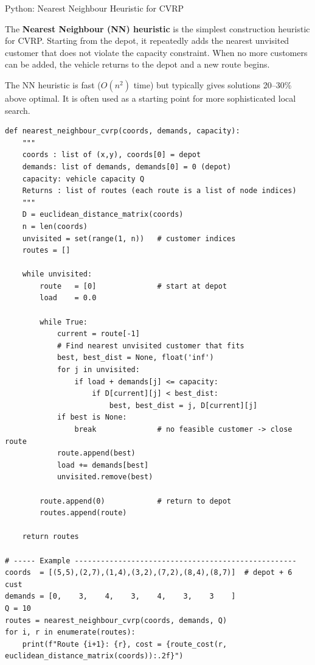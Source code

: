 \documentclass[aspectratio=169,10pt]{beamer}
\begin{document}
\begin{frame}[fragile]{Python: Nearest Neighbour Heuristic for CVRP}

The \textbf{Nearest Neighbour (NN) heuristic} is the simplest construction heuristic
for CVRP.  Starting from the depot, it repeatedly adds the nearest unvisited customer
that does not violate the capacity constraint.  When no more customers can be added,
the vehicle returns to the depot and a new route begins.

The NN heuristic is fast ($O(n^2)$ time) but typically gives solutions 20--30\% above
optimal.  It is often used as a starting point for more sophisticated local search.

\begin{lstlisting}[caption={Nearest Neighbour heuristic for CVRP}]
def nearest_neighbour_cvrp(coords, demands, capacity):
    """
    coords : list of (x,y), coords[0] = depot
    demands: list of demands, demands[0] = 0 (depot)
    capacity: vehicle capacity Q
    Returns : list of routes (each route is a list of node indices)
    """
    D = euclidean_distance_matrix(coords)
    n = len(coords)
    unvisited = set(range(1, n))   # customer indices
    routes = []

    while unvisited:
        route   = [0]              # start at depot
        load    = 0.0

        while True:
            current = route[-1]
            # Find nearest unvisited customer that fits
            best, best_dist = None, float('inf')
            for j in unvisited:
                if load + demands[j] <= capacity:
                    if D[current][j] < best_dist:
                        best, best_dist = j, D[current][j]
            if best is None:
                break              # no feasible customer -> close route
            route.append(best)
            load += demands[best]
            unvisited.remove(best)

        route.append(0)            # return to depot
        routes.append(route)

    return routes

# ----- Example ---------------------------------------------------
coords  = [(5,5),(2,7),(1,4),(3,2),(7,2),(8,4),(8,7)]  # depot + 6 cust
demands = [0,    3,    4,    3,    4,    3,    3    ]
Q = 10
routes = nearest_neighbour_cvrp(coords, demands, Q)
for i, r in enumerate(routes):
    print(f"Route {i+1}: {r}, cost = {route_cost(r, euclidean_distance_matrix(coords)):.2f}")
\end{lstlisting}

\end{frame}
\end{document}

